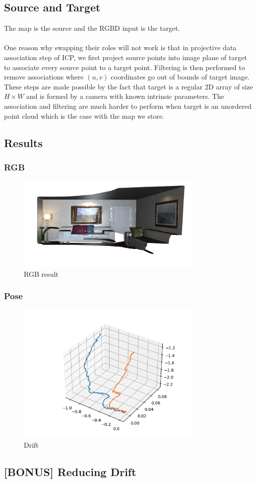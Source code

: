 \documentclass[12pt, a4paper]{article}
\begin{document}
\subsection{Source and Target}
The map is the source and the RGBD input is the target.\\\\
One reason why swapping their roles will not work is that in projective data association step of ICP, we first project source points into image plane of target to associate every source point to a target point. Filtering is then performed to remove associations where $(u, v)$ coordinates go out of bounds of target image. These steps are made possible by the fact that target is a regular 2D array of size $H\times W$ and is formed by a camera with known intrinsic parameters. The association and filtering are much harder to perform when target is an unordered point cloud which is the case with the map we store.
\subsection{Results}
\subsubsection{RGB}
\begin{figure}[H]
  \centering
  \includegraphics[width=0.8\textwidth]{./results/dense_slam/rgb.png}
  \caption{RGB result}
\end{figure}
\subsubsection{Pose}
\begin{figure}[H]
  \centering
  \includegraphics[width=0.8\textwidth]{./results/dense_slam/pose.png}
  \caption{Drift}
\end{figure}
\subsection{[BONUS] Reducing Drift}
\end{document}
